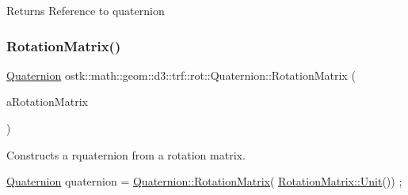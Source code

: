 \begin{DoxyReturn}{Returns}
Reference to quaternion 
\end{DoxyReturn}
\mbox{\label{classostk_1_1math_1_1geom_1_1d3_1_1trf_1_1rot_1_1_quaternion_acaf18c1140ca8380d9368feabfd99875}} 
\subsubsection{\texorpdfstring{Rotation\+Matrix()}{RotationMatrix()}}
{\footnotesize\ttfamily \hyperlink{classostk_1_1math_1_1geom_1_1d3_1_1trf_1_1rot_1_1_quaternion}{Quaternion} ostk\+::math\+::geom\+::d3\+::trf\+::rot\+::\+Quaternion\+::\+Rotation\+Matrix (\begin{DoxyParamCaption}\item[{const \hyperlink{classostk_1_1math_1_1geom_1_1d3_1_1trf_1_1rot_1_1_rotation_matrix}{rot\+::\+Rotation\+Matrix} \&}]{a\+Rotation\+Matrix }\end{DoxyParamCaption})\hspace{0.3cm}{\ttfamily [static]}}



Constructs a rquaternion from a rotation matrix. 


\begin{DoxyCode}
\hyperlink{classostk_1_1math_1_1geom_1_1d3_1_1trf_1_1rot_1_1_quaternion_ad9fd7d8eb5effb4d4e0394bbb5bb86dc}{Quaternion} quaternion = \hyperlink{classostk_1_1math_1_1geom_1_1d3_1_1trf_1_1rot_1_1_quaternion_acaf18c1140ca8380d9368feabfd99875}{Quaternion::RotationMatrix}(
      \hyperlink{classostk_1_1math_1_1geom_1_1d3_1_1trf_1_1rot_1_1_rotation_matrix_a37c25a2ddaa1dcd24be8dd568259a9b8}{RotationMatrix::Unit}()) ;
\end{DoxyCode}




